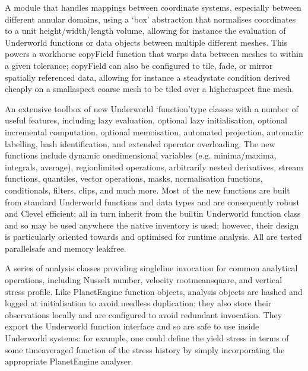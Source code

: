 \documentclass[letterpaper,10pt,english]{jupyterBook}
\begin{document}
\sphinxAtStartPar
A module that handles mappings between coordinate systems, especially between different annular domains, using a ‘box’ abstraction that normalises coordinates to a unit height/width/length volume, allowing \sphinxhyphen{} for instance \sphinxhyphen{} the evaluation of Underworld functions or data objects between multiple different meshes. This powers a workhorse copyField function that warps data between meshes to within a given tolerance; copyField can also be configured to tile, fade, or mirror spatially referenced data, allowing \sphinxhyphen{} for instance \sphinxhyphen{} a steady\sphinxhyphen{}state condition derived cheaply on a small\sphinxhyphen{}aspect coarse mesh to be tiled over a higher\sphinxhyphen{}aspect fine mesh.

\sphinxAtStartPar
An extensive toolbox of new Underworld ‘function’\sphinxhyphen{}type classes with a number of useful features, including lazy evaluation, optional lazy initialisation, optional incremental computation, optional memoisation, automated projection, automatic labelling, hash identification, and extended operator overloading. The new functions include dynamic one\sphinxhyphen{}dimensional variables (e.g. minima/maxima, integrals, average), region\sphinxhyphen{}limited operations, arbitrarily nested derivatives, stream functions, quantiles, vector operations, masks, normalisation functions, conditionals, filters, clips, and much more. Most of the new functions are built from standard Underworld functions and data types and are consequently robust and C\sphinxhyphen{}level efficient; all in turn inherit from the built\sphinxhyphen{}in Underworld function class and so may be used anywhere the native inventory is used; however, their design is particularly oriented towards and optimised for run\sphinxhyphen{}time analysis. All are tested parallel\sphinxhyphen{}safe and memory leak\sphinxhyphen{}free.

\sphinxAtStartPar
A series of analysis classes providing single\sphinxhyphen{}line invocation for common analytical operations, including Nusselt number, velocity root\sphinxhyphen{}mean\sphinxhyphen{}square, and vertical stress profile. Like PlanetEngine function objects, analysis objects are hashed and logged at initialisation to avoid needless duplication; they also store their observations locally and are configured to avoid redundant invocation. They export the Underworld function interface and so are safe to use inside Underworld systems: for example, one could define the yield stress in terms of some time\sphinxhyphen{}averaged function of the stress history by simply incorporating the appropriate PlanetEngine analyser.
\end{document}

